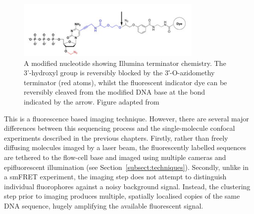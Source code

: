 \begin{figure}
\centerline{\includegraphics[width=0.8\textwidth]{illumina/illumina_linker.pdf}}
\caption{A modified nucleotide showing Illumina terminator chemistry. The 3'-hydroxyl group is reversibly blocked by the 3′-O-azidomethy terminator (red atoms), whilst the fluorescent indicator dye can be reversibly cleaved from the modified DNA base at the bond indicated by the arrow. Figure adapted from~\cite{Chen2013}}
\label{fig:terminator}
\end{figure}  

This is a fluorescence based imaging technique. However, there are several major differences between this sequencing process and the single-molecule confocal experiments described in the previous chapters. Firstly, rather than freely diffusing molecules imaged by a laser beam, the fluorescently labelled sequences are tethered to the flow-cell base and imaged using multiple cameras and epifluorescent illumination (see Section~\ref{subsect:techniques}). Secondly, unlike in a smFRET experiment, the imaging step does not attempt to distinguish individual fluorophores against a noisy background signal. Instead, the clustering step prior to imaging produces multiple, spatially localised copies of the same DNA sequence, hugely amplifying the available fluorescent signal. 

